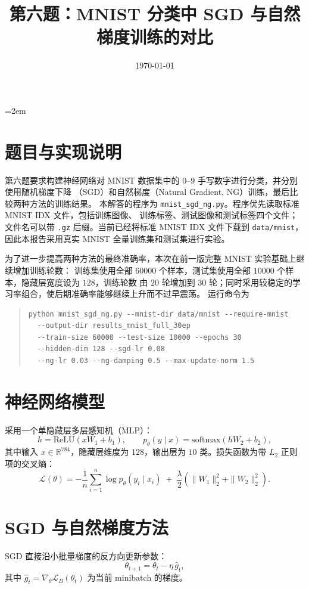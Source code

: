 \documentclass[UTF8]{ctexart}
\title{第六题：MNIST 分类中 SGD 与自然梯度训练的对比}
\author{}
\date{\today}
\begin{document}
\emergencystretch=2em
\maketitle

\section{题目与实现说明}

第六题要求构建神经网络对 MNIST 数据集中的 $0$--$9$ 手写数字进行分类，并分别使用随机梯度下降
（SGD）和自然梯度（Natural Gradient, NG）训练，最后比较两种方法的训练结果。
本解答的程序为 \texttt{mnist\_sgd\_ng.py}。程序优先读取标准 MNIST IDX 文件，包括训练图像、
训练标签、测试图像和测试标签四个文件；文件名可以带 \texttt{.gz} 后缀。当前已经将标准 MNIST
IDX 文件下载到 \texttt{data/mnist}，因此本报告采用真实 MNIST 全量训练集和测试集进行实验。

为了进一步提高两种方法的最终准确率，本次在前一版完整 MNIST 实验基础上继续增加训练轮数：
训练集使用全部 $60000$ 个样本，测试集使用全部 $10000$ 个样本，隐藏层宽度设为 $128$，训练轮数
由 $20$ 轮增加到 $30$ 轮；同时采用较稳定的学习率组合，使后期准确率能够继续上升而不过早震荡。
运行命令为
\begin{quote}
\small
\begin{verbatim}
python mnist_sgd_ng.py --mnist-dir data/mnist --require-mnist
  --output-dir results_mnist_full_30ep
  --train-size 60000 --test-size 10000 --epochs 30
  --hidden-dim 128 --sgd-lr 0.08
  --ng-lr 0.03 --ng-damping 0.5 --max-update-norm 1.5
\end{verbatim}
\end{quote}

\section{神经网络模型}

采用一个单隐藏层多层感知机（MLP）：
\[
h=\mathrm{ReLU}(xW_1+b_1),\qquad
p_\theta(y\mid x)=\mathrm{softmax}(hW_2+b_2),
\]
其中输入 $x\in\mathbb{R}^{784}$，隐藏层维度为 $128$，输出层为 $10$ 类。损失函数为带 $L_2$
正则项的交叉熵：
\[
\mathcal{L}(\theta)=
-\frac{1}{n}\sum_{i=1}^{n}\log p_\theta(y_i\mid x_i)
\;+\;\frac{\lambda}{2}\left(\|W_1\|_2^2+\|W_2\|_2^2\right).
\]

\section{SGD 与自然梯度方法}

SGD 直接沿小批量梯度的反方向更新参数：
\[
\theta_{t+1}=\theta_t-\eta\,\hat g_t,
\]
其中 $\hat g_t=\nabla_\theta \mathcal{L}_B(\theta_t)$ 为当前 minibatch 的梯度。
\end{document}
